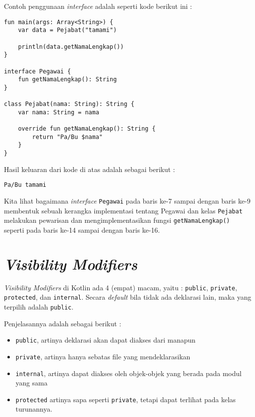 Contoh penggunaan \textit{interface} adalah seperti kode berikut ini :

\begin{lstlisting}
fun main(args: Array<String>) {
	var data = Pejabat("tamami")
	
	println(data.getNamaLengkap())
}

interface Pegawai {
	fun getNamaLengkap(): String
}

class Pejabat(nama: String): String {
	var nama: String = nama
	
	override fun getNamaLengkap(): String {
		return "Pa/Bu $nama"
	}
}
\end{lstlisting}

Hasil keluaran dari kode di atas adalah sebagai berikut :

\begin{lstlisting}
Pa/Bu tamami
\end{lstlisting}

Kita lihat bagaimana \textit{interface} \texttt{Pegawai} pada baris ke-7 sampai dengan baris ke-9 membentuk sebuah kerangka implementasi tentang Pegawai dan kelas \texttt{Pejabat} melakukan pewarisan dan mengimplementasikan fungsi \texttt{getNamaLengkap()} seperti pada baris ke-14 sampai dengan baris ke-16.

\section{\textit{Visibility Modifiers}}

\textit{Visibility Modifiers} di Kotlin ada 4 (empat) macam, yaitu : \texttt{public}, \texttt{private}, \texttt{protected}, dan \texttt{internal}. Secara \textit{default} bila tidak ada deklarasi lain, maka yang terpilih adalah \texttt{public}.

Penjelasannya adalah sebagai berikut :

\begin{itemize}
	\item \texttt{public}, artinya deklarasi akan dapat diakses dari manapun
	\item \texttt{private}, artinya hanya sebatas file yang mendeklarasikan
	\item \texttt{internal}, artinya dapat diakses oleh objek-objek yang berada pada modul yang sama
	\item \texttt{protected} artinya sapa seperti \texttt{private}, tetapi dapat terlihat pada kelas turunannya.
\end{itemize}

